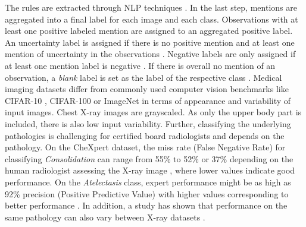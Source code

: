 The rules are extracted through NLP techniques \citep{Irvin2019}.
In the last step, mentions are aggregated into a final label for each image and each class.
Observations with at least one positive labeled mention are assigned to an aggregated positive label.
An uncertainty label is assigned if there is no positive mention and at least one mention of uncertainty in the observations \citep{Irvin2019}.
Negative labels are only assigned if at least one mention label is negative \citep{Irvin2019}. 
If there is overall no mention of an observation, a \textit{blank} label is set as the label of the respective class \citep{Irvin2019}.
Medical imaging datasets differ from commonly used computer vision benchmarks like CIFAR-10 \citep{Krizhevsky2009a}, CIFAR-100 \citep{Krizhevsky2009b} or ImageNet \citep{Deng2009} in terms of appearance and variability of input images.
Chest X-ray images are grayscaled.
As only the upper body part is included, there is also low input variability.
Further, classifying the underlying pathologies is challenging for certified board radiologists and depends on the pathology.
On the CheXpert dataset, the miss rate (False Negative Rate) for classifying \textit{Consolidation} can range from 55\% to 52\% or 37\% depending on the human radiologist assessing the X-ray image \citep{Irvin2019}, where lower values indicate good performance.
On the \textit{Atelectasis} class, expert performance might be as high as 92\% precision (Positive Predictive Value) with higher values corresponding to better performance \citep{Irvin2019}.
In addition, a study has shown that performance on the same pathology can also vary between X-ray datasets \citep{Majkowska2020}.
\par
